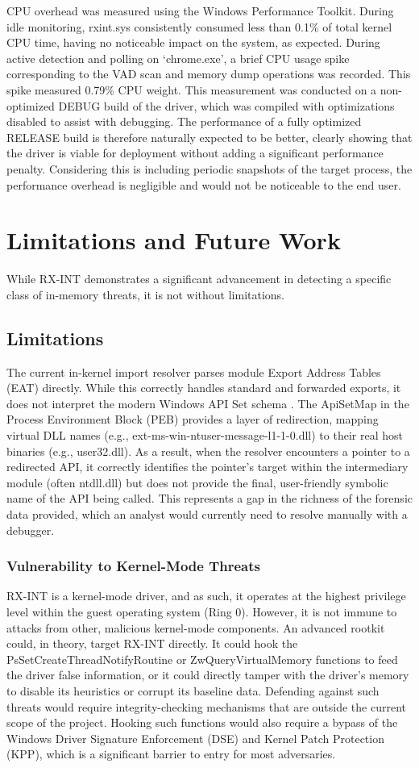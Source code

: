 \documentclass[journal]{IEEEtran}
\begin{document}
CPU overhead was measured using the Windows Performance Toolkit. During idle monitoring, rxint.sys consistently consumed less than 0.1\% of total kernel CPU time, having no noticeable impact on the system, as expected. During active detection and polling on `chrome.exe', a brief CPU usage spike corresponding to the VAD scan and memory dump operations was recorded. This spike measured 0.79\% CPU weight. This measurement was conducted on a non-optimized DEBUG build of the driver, which was compiled with optimizations disabled to assist with debugging. The performance of a fully optimized RELEASE build is therefore naturally expected to be better, clearly showing that the driver is viable for deployment without adding a significant performance penalty. Considering this is including periodic snapshots of the target process, the performance overhead is negligible and would not be noticeable to the end user.

\section{Limitations and Future Work}
\label{sec:limitations}
While RX-INT demonstrates a significant advancement in detecting a specific class of in-memory threats, it is not without limitations.
\subsection{Limitations}
The current in-kernel import resolver parses module Export Address Tables (EAT) directly. While this correctly handles standard and forwarded exports, it does not interpret the modern Windows API Set schema \cite{MSDN_APISets}. The ApiSetMap in the Process Environment Block (PEB) provides a layer of redirection, mapping virtual DLL names (e.g., ext-ms-win-ntuser-message-l1-1-0.dll) to their real host binaries (e.g., user32.dll). As a result, when the resolver encounters a pointer to a redirected API, it correctly identifies the pointer's target within the intermediary module (often ntdll.dll) but does not provide the final, user-friendly symbolic name of the API being called. This represents a gap in the richness of the forensic data provided, which an analyst would currently need to resolve manually with a debugger.
\subsubsection{Vulnerability to Kernel-Mode Threats}
RX-INT is a kernel-mode driver, and as such, it operates at the highest privilege level within the guest operating system (Ring 0). However, it is not immune to attacks from other, malicious kernel-mode components. An advanced rootkit could, in theory, target RX-INT directly. It could hook the PsSetCreateThreadNotifyRoutine or ZwQueryVirtualMemory functions to feed the driver false information, or it could directly tamper with the driver's memory to disable its heuristics or corrupt its baseline data. Defending against such threats would require integrity-checking mechanisms that are outside the current scope of the project. Hooking such functions would also require a bypass of the Windows Driver Signature Enforcement (DSE) and Kernel Patch Protection (KPP), which is a significant barrier to entry for most adversaries.
\end{document}
